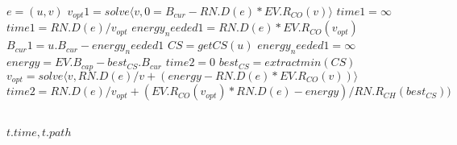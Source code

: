\begin{algorithmic}
	\State $e = (u, v)$
	\State $v_{opt}1 = solve\langle v, 0 = B_{cur}-RN.D(e)*EV.R_{CO}(v)\rangle$
		\State $time1 = \infty$
	\Else
		\State $time1 = RN.D(e) / v_{opt}$
		\State $energy_needed1 = RN.D(e)*EV.R_{CO}(v_{opt})$
		\State $B_{cur}1 = u.B_{cur} - energy_needed1$
	\EndIf
		\State $CS = getCS(u)$ 
		\State $energy_needed1 = \infty$
		\State $energy = EV.B_{cap} - best_{CS}.B_{cur}$
		\State $time2 = 0$
		\State $best_{CS} = extractmin(CS)$
		\State $v_{opt} = solve \langle v, RN.D(e)/v + (energy-RN.D(e)*EV.R_{CO}(v)) \rangle$
		\State $time2 = RN.D(e)/v_{opt} + (EV.R_{CO}(v_{opt})*RN.D(e) - energy)/RN.R_{CH}(best_{CS}))$
		\

	\EndWhile


	\State \Return $t.time, t.path$
\EndFunction
\end{algorithmic}\label{alg:fastest_path}








